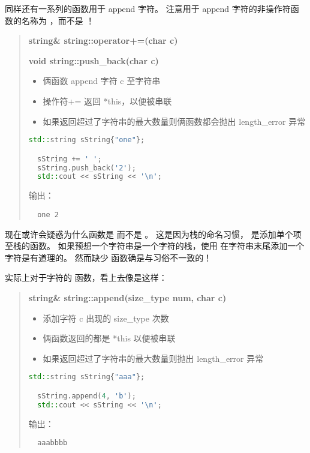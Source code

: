 \documentclass[../../LearnCpp.tex]{subfiles}
\begin{document}
同样还有一系列的函数用于 append 字符。
注意用于 append 字符的非操作符函数的名称为 ，而不是 ！

\begin{quotation}
  \textbf{string\& string::operator+=(char c)}

  \textbf{void string::push\_back(char c)}

  \begin{itemize}
    \item 俩函数 append 字符 c 至字符串
    \item 操作符+= 返回 *this，以便被串联
    \item 如果返回超过了字符串的最大数量则俩函数都会抛出 length\_error 异常
  \end{itemize}

  \begin{lstlisting}[language=C++]
  std::string sString{"one"};

  sString += ' ';
  sString.push_back('2');
  std::cout << sString << '\n';
  \end{lstlisting}

  输出：

  \begin{lstlisting}
  one 2
  \end{lstlisting}
\end{quotation}

现在或许会疑惑为什么函数是  而不是 。
这是因为栈的命名习惯， 是添加单个项至栈的函数。
如果预想一个字符串是一个字符的栈，使用  在字符串末尾添加一个字符是有道理的。
然而缺少  函数确是与习俗不一致的！

实际上对于字符的  函数，看上去像是这样：

\begin{quotation}
  \textbf{string\& string::append(size\_type num, char c)}

  \begin{itemize}
    \item 添加字符 c 出现的 size\_type 次数
    \item 俩函数返回的都是 *this 以便被串联
    \item 如果返回超过了字符串的最大数量则抛出 length\_error 异常
  \end{itemize}

  \begin{lstlisting}[language=C++]
  std::string sString{"aaa"};

  sString.append(4, 'b');
  std::cout << sString << '\n';
  \end{lstlisting}

  输出：

  \begin{lstlisting}
  aaabbbb
  \end{lstlisting}
\end{quotation}
\end{document}
